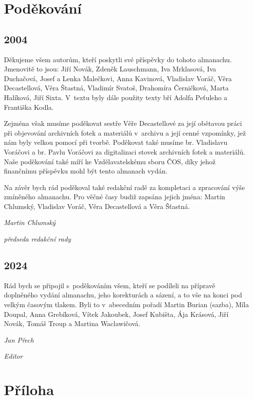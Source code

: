 \documentclass[a5paper, 11pt, twoside]{article}
\begin{document}
\clearpage
\section{Poděkování}

\subsection{2004}

Děkujeme všem autorům, kteří poskytli své příspěvky do tohoto almanachu.
Jmenovitě to jsou: Jiří Novák, Zdeněk Lauschmann, Iva Mrklasová, Iva
Duchačová, Josef a Lenka Malečkovi, Anna Kavinová, Vladislav Voráč, Věra
Decastellová, Věra Štastná, Vladimír Svatoš, Drahomíra Černičková, Marta
Halíková, Jiří Sixta. V~textu byly dále použity texty bří Adolfa
Peťuleho a Františka Kodla.

Zejména však musíme poděkovat sestře Věře Decastellové za její obětavou
práci při objevování archivních fotek a materiálů v~archivu a její cenné
vzpomínky, jež nám byly velkou pomocí při tvorbě. Poděkovat také musíme
br. Vladislavu Voráčovi a br. Pavlu Voráčovi za digitalizaci stovek
archivních fotek a materiálů. Naše poděkování také míří ke
Vzdělavatelskému sboru ČOS, díky jehož finančnímu příspěvku mohl být
tento almanach vydán.

Na závěr bych rád poděkoval také redakční radě za kompletaci a
zpracování výše zmíněného almanachu. Pro věčné časy budiž zapsána jejich
jména: Martin Chlumský, Vladislav Voráč, Věra Decastellová a Věra
Šťastná.

\hfill\textit{Martin Chlumský}

\hfill\textit{předseda redakční rady}

\subsection{2024}

Rád bych se připojil s~poděkováním všem, kteří se podíleli na přípravě
doplněného vydání almanachu, jeho korekturách a sázení, a to vše na
konci pod velkým časovým tlakem. Byli to v~abecedním pořadí Martin
Burian (sazba), Míla Doupal, Anna Grebíková, Vítek Jakoubek, Josef
Kubišta, Ája Krásová, Jiří Novák, Tomáš Troup a Martina Waclawičová.

\hfill\textit{Jan Přech}

\hfill\textit{Editor}

\cleardoublepage
\section{Příloha}
\end{document}
